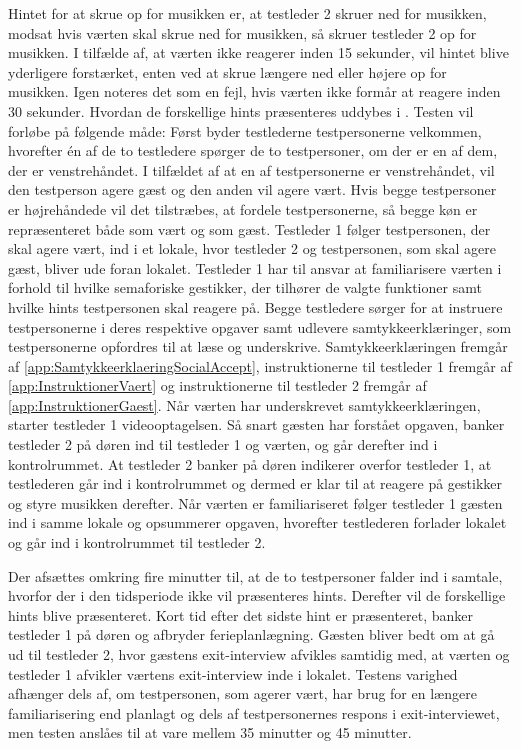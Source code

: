 Hintet for at skrue op for musikken er, at testleder 2 skruer ned for musikken, modsat hvis værten skal skrue ned for musikken, så skruer testleder 2 op for musikken. I tilfælde af, at værten ikke reagerer inden 15 sekunder, vil hintet blive yderligere forstærket, enten ved at skrue længere ned eller højere op for musikken. Igen noteres det som en fejl, hvis værten ikke formår at reagere inden 30 sekunder. Hvordan de forskellige hints præsenteres uddybes i .\blankline
% 
Testen vil forløbe på følgende måde: Først byder testlederne testpersonerne velkommen, hvorefter én af de to testledere spørger de to testpersoner, om der er en af dem, der er venstrehåndet. I tilfældet af at en af testpersonerne er venstrehåndet, vil den testperson agere gæst og den anden vil agere vært. Hvis begge testpersoner er højrehåndede vil det tilstræbes, at fordele testpersonerne, så begge køn er repræsenteret både som vært og som gæst. Testleder 1 følger testpersonen, der skal agere vært, ind i et lokale, hvor testleder 2 og testpersonen, som skal agere gæst, bliver ude foran lokalet. Testleder 1 har til ansvar at familiarisere værten i forhold til hvilke semaforiske gestikker, der tilhører de valgte funktioner samt hvilke hints testpersonen skal reagere på. Begge testledere sørger for at instruere testpersonerne i deres respektive opgaver samt udlevere samtykkeerklæringer, som testpersonerne opfordres til at læse og underskrive. Samtykkeerklæringen fremgår af \autoref{app:SamtykkeerklaeringSocialAccept}, instruktionerne til testleder 1 fremgår af \autoref{app:InstruktionerVaert} og instruktionerne til testleder 2 fremgår af \autoref{app:InstruktionerGaest}. Når værten har underskrevet samtykkeerklæringen, starter testleder 1 videooptagelsen. Så snart gæsten har forstået opgaven, banker testleder 2 på døren ind til testleder 1 og værten, og går derefter ind i kontrolrummet. At testleder 2 banker på døren indikerer overfor testleder 1, at testlederen går ind i kontrolrummet og dermed er klar til at reagere på gestikker og styre musikken derefter. Når værten er familiariseret følger testleder 1 gæsten ind i samme lokale og opsummerer opgaven, hvorefter testlederen forlader lokalet og går ind i kontrolrummet til testleder 2.
 
Der afsættes omkring fire minutter til, at de to testpersoner falder ind i samtale, hvorfor der i den tidsperiode ikke vil præsenteres hints. Derefter vil de forskellige hints blive præsenteret. Kort tid efter det sidste hint er præsenteret, banker testleder 1 på døren og afbryder ferieplanlægning. Gæsten bliver bedt om at gå ud til testleder 2, hvor gæstens exit-interview afvikles samtidig med, at værten og testleder 1 afvikler værtens exit-interview inde i lokalet.\blankline
%
Testens varighed afhænger dels af, om testpersonen, som agerer vært, har brug for en længere familiarisering end planlagt og dels af testpersonernes respons i exit-interviewet, men testen anslåes til at vare mellem 35 minutter og 45 minutter. 
%
